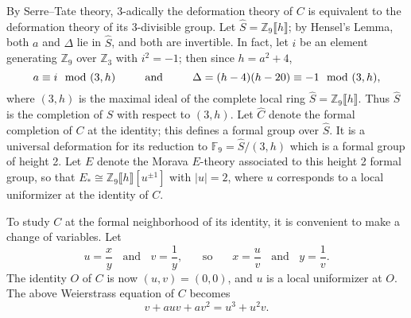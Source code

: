 \documentclass{gtpart}
\theoremstyle{definition}
\theoremstyle{remark}
\newcommand{\mb}[1]{\mathbb{#1}}
\newcommand{\BF}{{\mb F}}
\newcommand{\BZ}{{\mb Z}}
\newcommand{\HC}{\widehat{C}}
\newcommand{\HS}{\widehat{S}}
\newcommand{\md}{~~{\rm mod}~}
\begin{document}
By Serre--Tate theory, 3-adically the deformation theory of $C$ is equivalent to the deformation theory of its 3-divisible group.  
Let $\HS = \BZ_9 \llbracket h \rrbracket$; by Hensel's Lemma, both $a$ and $\Delta$ lie in $\HS$, and both are invertible.  
In fact, let $i$ be an element generating $\BZ_9$ over $\BZ_3$ with $i^2 = -1$; then since $h = a^2 + 4$, 
\[
 a \equiv i \md (3,h)~~~~~~~~\text{and}~~~~~~~~\Delta = (h - 4) (h - 20) \equiv -1 \md (3,h), 
\]
where $(3,h)$ is the maximal ideal of the complete local ring $\HS = \BZ_9 \llbracket h \rrbracket$.  
Thus $\HS$ is the completion of $S$ with respect to $(3,h)$.  
Let $\HC$ denote the formal completion of $C$ at the identity; this defines a formal group over $\HS$.  
It is a universal deformation for its reduction to $\BF_9 = \HS / (3,h)$ which is a formal group of height 2.  
Let $E$ denote the Morava $E$-theory associated to this height 2 formal group, 
so that $E_* \cong \BZ_9 \llbracket h \rrbracket [u^{\pm 1}]$ with $|u| = 2$, 
where $u$ corresponds to a local uniformizer at the identity of $C$.  

To study $C$ at the formal neighborhood of its identity, it is convenient to make a change of variables.  
Let 
\[
 u = \frac{x}{y}~~~~\text{and}~~~~v = \frac{1}{y},~~~~~~~~\text{so}~~~~~~~~x = \frac{u}{v}~~~~\text{and}~~~~y = \frac{1}{v}.  
\]
The identity $O$ of $C$ is now $(u,v) = (0,0)$, and $u$ is a local uniformizer at $O$.  
The above Weierstrass equation of $C$ becomes 
\begin{equation}
\label{nf}
 v + a u v + a v^2 = u^3 + u^2 v.  
\end{equation}
\end{document}
